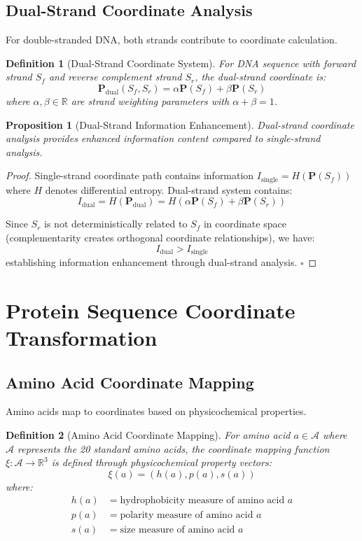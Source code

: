 \documentclass[12pt,a4paper]{article}
\newtheorem{definition}{Definition}
\newtheorem{proposition}{Proposition}
\begin{document}
\subsection{Dual-Strand Coordinate Analysis}

For double-stranded DNA, both strands contribute to coordinate calculation.

\begin{definition}[Dual-Strand Coordinate System]
For DNA sequence with forward strand $S_f$ and reverse complement strand $S_r$, the dual-strand coordinate is:
$$\mathbf{P}_{\text{dual}}(S_f, S_r) = \alpha \mathbf{P}(S_f) + \beta \mathbf{P}(S_r)$$
where $\alpha, \beta \in \mathbb{R}$ are strand weighting parameters with $\alpha + \beta = 1$.
\end{definition}

\begin{proposition}[Dual-Strand Information Enhancement]
Dual-strand coordinate analysis provides enhanced information content compared to single-strand analysis.
\end{proposition}

\begin{proof}
Single-strand coordinate path contains information $I_{\text{single}} = H(\mathbf{P}(S_f))$ where $H$ denotes differential entropy. Dual-strand system contains:
$$I_{\text{dual}} = H(\mathbf{P}_{\text{dual}}) = H(\alpha \mathbf{P}(S_f) + \beta \mathbf{P}(S_r))$$

Since $S_r$ is not deterministically related to $S_f$ in coordinate space (complementarity creates orthogonal coordinate relationships), we have:
$$I_{\text{dual}} > I_{\text{single}}$$
establishing information enhancement through dual-strand analysis. $\square$
\end{proof}

\section{Protein Sequence Coordinate Transformation}

\subsection{Amino Acid Coordinate Mapping}

Amino acids map to coordinates based on physicochemical properties.

\begin{definition}[Amino Acid Coordinate Mapping]
For amino acid $a \in \mathcal{A}$ where $\mathcal{A}$ represents the 20 standard amino acids, the coordinate mapping function $\xi: \mathcal{A} \rightarrow \mathbb{R}^3$ is defined through physicochemical property vectors:
$$\xi(a) = (h(a), p(a), s(a))$$
where:
\begin{align}
h(a) &= \text{hydrophobicity measure of amino acid } a \\
p(a) &= \text{polarity measure of amino acid } a \\
s(a) &= \text{size measure of amino acid } a
\end{align}
\end{definition}
\end{document}
